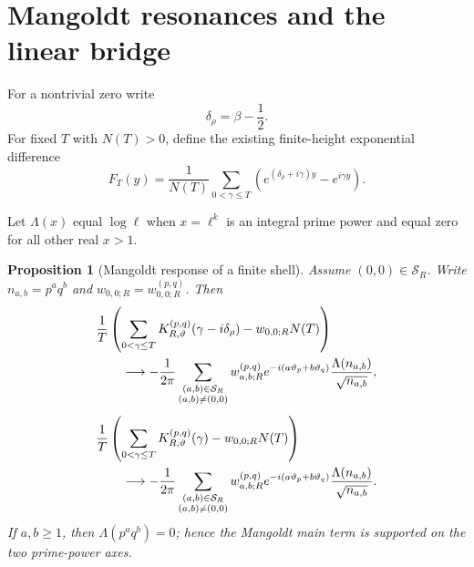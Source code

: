 \documentclass[11pt]{amsart}
\numberwithin{equation}{section}
\theoremstyle{plain}
\newtheorem{proposition}[theorem]{Proposition}
\theoremstyle{definition}
\theoremstyle{remark}
\begin{document}
\section{Mangoldt resonances and the linear bridge}
\label{sec:mangoldt_bridge}

For a nontrivial zero write
\begin{equation}
\delta_\rho=\beta-\frac12.
\label{eq:horizontal_displacement}
\end{equation}
For fixed $T$ with $N(T)>0$, define the existing finite-height exponential difference
\begin{equation}
F_T(y)
=
\frac1{N(T)}
\sum_{0<\gamma\leq T}
\left(e^{(\delta_\rho+i\gamma)y}-e^{i\gamma y}\right).
\label{eq:FT}
\end{equation}

Let $\Lambda(x)$ equal $\log \ell$ when $x=\ell^k$ is an integral prime power and equal zero for all other real $x>1$.

\begin{proposition}[Mangoldt response of a finite shell]
\label{prop:mangoldt_response}
Assume $(0,0)\in\mathcal S_R$.  Write $n_{a,b}=p^aq^b$ and $w_{0,0;R}=w_{0,0;R}^{(p,q)}$.  Then
\begin{align}
&\frac1T
\left(
\sum_{0<\gamma\leq T}
K_{R,\vartheta}^{(p,q)}(\gamma-i\delta_\rho)
-w_{0,0;R}N(T)
\right)
\label{eq:complete_mangoldt_response}
\\
&\qquad\longrightarrow
-\frac1{2\pi}
\sum_{\substack{(a,b)\in\mathcal S_R\\(a,b)\neq(0,0)}}
w_{a,b;R}^{(p,q)}e^{-i(a\vartheta_p+b\vartheta_q)}
\frac{\Lambda(n_{a,b})}{\sqrt{n_{a,b}}},
\notag
\\[1ex]
&\frac1T
\left(
\sum_{0<\gamma\leq T}
K_{R,\vartheta}^{(p,q)}(\gamma)
-w_{0,0;R}N(T)
\right)
\label{eq:ordinate_mangoldt_response}
\\
&\qquad\longrightarrow
-\frac1{2\pi}
\sum_{\substack{(a,b)\in\mathcal S_R\\(a,b)\neq(0,0)}}
w_{a,b;R}^{(p,q)}e^{-i(a\vartheta_p+b\vartheta_q)}
\frac{\Lambda(n_{a,b})}{\sqrt{n_{a,b}}}.
\notag
\end{align}
If $a,b\geq1$, then $\Lambda(p^aq^b)=0$; hence the Mangoldt main term is supported on the two prime-power axes.
\end{proposition}
\end{document}
